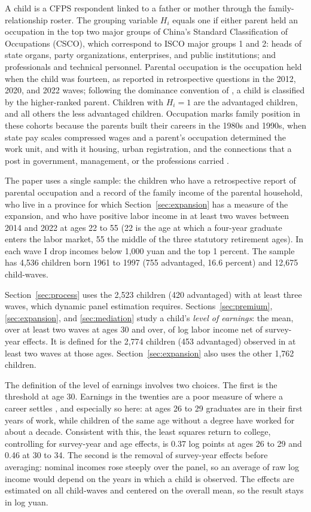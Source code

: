 \documentclass[11pt]{article}
\begin{document}
A child is a CFPS respondent linked to a father or mother through the family-relationship roster. The grouping variable $H_i$ equals one if either parent held an occupation in the top two major groups of China's Standard Classification of Occupations (CSCO), which correspond to ISCO major groups 1 and 2: heads of state organs, party organizations, enterprises, and public institutions; and professionals and technical personnel. Parental occupation is the occupation held when the child was fourteen, as reported in retrospective questions in the 2012, 2020, and 2022 waves; following the dominance convention of \citet{EriksonGoldthorpe1992}, a child is classified by the higher-ranked parent. Children with $H_i = 1$ are the advantaged children, and all others the less advantaged children. Occupation marks family position in these cohorts because the parents built their careers in the 1980s and 1990s, when state pay scales compressed wages and a parent's occupation determined the work unit, and with it housing, urban registration, and the connections that a post in government, management, or the professions carried \citep{BianLogan1996, WuTreiman2007}.

The paper uses a single sample: the children who have a retrospective report of parental occupation and a record of the family income of the parental household, who live in a province for which Section~\ref{sec:expansion} has a measure of the expansion, and who have positive labor income in at least two waves between 2014 and 2022 at ages 22 to 55 (22 is the age at which a four-year graduate enters the labor market, 55 the middle of the three statutory retirement ages). In each wave I drop incomes below 1,000 yuan and the top 1 percent. The sample has 4,536 children born 1961 to 1997 (755 advantaged, 16.6 percent) and 12,675 child-waves.

Section~\ref{sec:process} uses the 2,523 children (420 advantaged) with at least three waves, which dynamic panel estimation requires. Sections~\ref{sec:premium}, \ref{sec:expansion}, and \ref{sec:mediation} study a child's \emph{level of earnings}: the mean, over at least two waves at ages 30 and over, of log labor income net of survey-year effects. It is defined for the 2,774 children (453 advantaged) observed in at least two waves at those ages. Section~\ref{sec:expansion} also uses the other 1,762 children.

The definition of the level of earnings involves two choices. The first is the threshold at age 30. Earnings in the twenties are a poor measure of where a career settles \citep{HaiderSolon2006}, and especially so here: at ages 26 to 29 graduates are in their first years of work, while children of the same age without a degree have worked for about a decade. Consistent with this, the least squares return to college, controlling for survey-year and age effects, is 0.37 log points at ages 26 to 29 and 0.46 at 30 to 34. The second is the removal of survey-year effects before averaging: nominal incomes rose steeply over the panel, so an average of raw log income would depend on the years in which a child is observed. The effects are estimated on all child-waves and centered on the overall mean, so the result stays in log yuan.
\end{document}
